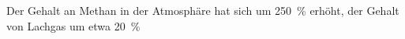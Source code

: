 \begin{frame}
	\vspace{-1cm}
	Der Gehalt an Methan in der Atmosphäre hat sich um 250 \,\% erhöht, der Gehalt von Lachgas um etwa 20 \,\%

\end{frame}



%	

